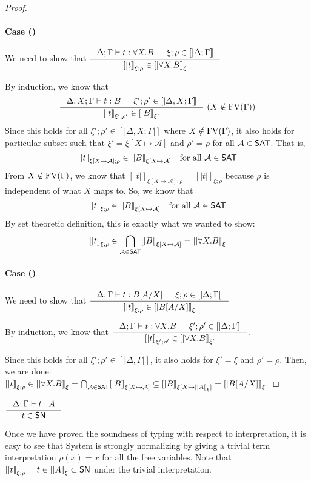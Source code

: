 \begin{proof}
\paragraph{Case ()}
We need to show that
$ \inference{\Delta;\Gamma |- t : \forall X.B & \xi;\rho\in[|\Delta;\Gamma|]}
        {[|t|]_{\xi;\rho} \in [|\forall X.B|]_\xi} $

By induction, we know that
\[ \inference{\Delta,X;\Gamma |- t : B & \xi';\rho'\in[|\Delta,X;\Gamma|]}
        {[|t|]_{\xi';\rho'} \in [|B|]_{\xi'}} ~
        (X\notin\FV(\Gamma))
\]
Since this holds for all $\xi';\rho' \in [|\Delta,X;\Gamma|]$ where
$X\notin\mathop{\mathrm{FV}}(\Gamma)$, it also holds for particular subset such that
$\xi' = \xi[X\mapsto\mathcal{A}]$ and $\rho'=\rho$ for all $\mathcal{A}\in\mathsf{SAT}$.
That is,
\[ [|t|]_{\xi[X\mapsto\mathcal{A}];\rho} \in [|B|]_{\xi[X\mapsto\mathcal{A}]}
   \quad \text{for all}~\mathcal{A}\in\mathsf{SAT} \]
From $X\notin\mathop{\mathrm{FV}}(\Gamma)$, we know that
$[|t|]_{\xi[X\mapsto\mathcal{A}];\rho} = [|t|]_{\xi;\rho}$
because $\rho$ is independent of what $X$ maps to.
So, we know that
\[ [|t|]_{\xi;\rho} \in [|B|]_{\xi[X\mapsto\mathcal{A}]}
        \quad \text{for all}~\mathcal{A}\in\mathsf{SAT} \]
By set theoretic definition, this is exactly what we wanted to show:
\[ [|t|]_{\xi;\rho} \in
        \bigcap_{\mathcal{A}\in\mathsf{SAT}} [|B|]_{\xi[X\mapsto\mathcal{A}]}
        = [|\forall X.B|]_\xi
\]

\paragraph{Case ()}
We need to show that
$ \inference{\Delta;\Gamma |- t : B[A/X] & \xi;\rho\in[|\Delta;\Gamma|]}
        {[|t|]_{\xi;\rho} \in [|B[A/X]|]_\xi} $

By induction, we know that
$ \inference{\Delta;\Gamma |- t : \forall X.B & \xi';\rho'\in[|\Delta;\Gamma|]}
        {[|t|]_{\xi';\rho'} \in [|\forall X.B|]_{\xi'}} $.

Since this holds for all $\xi';\rho' \in [|\Delta,\Gamma|]$,
it also holds for $\xi'=\xi$ and $\rho'=\rho$. Then, we are done:
$ [|t|]_{\xi;\rho} \in [|\forall X.B|]_{\xi}
        = \bigcap_{\mathcal{A}\in\mathsf{SAT}} [|B|]_{\xi[X\mapsto\mathcal{A}]}
        \subseteq [|B|]_{\xi[X\mapsto[|A|]_\xi]} = [|B[A/X]|]_\xi $.
\end{proof}

\begin{corollary}
        $\inference{\Delta;\Gamma |- t : A}{t \in \SN}$
\end{corollary}
Once we have proved the soundness of typing with respect to interpretation,
it is easy to see that System \F is strongly normalizing by giving a trivial term
interpretation $\rho(x) = x$ for all the free variables.
Note that $[|t|]_{\xi;\rho} = t \in [|A|]_\xi \subset \mathsf{SN}$
under the trivial interpretation.

